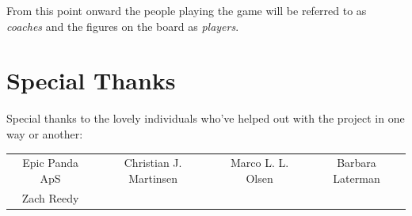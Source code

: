 \documentclass[a4paper]{book}
\begin{document}
\begin{note}
    From this point onward the people playing the game will be referred to as \textit{coaches} and the figures on the board as \textit{players}.
\end{note}

\section*{Special Thanks}
Special thanks to the lovely individuals who've helped out with the project in one way or another:
\begin{center}
    \begin{tabular}{cccc}
        Epic Panda ApS & Christian J. Martinsen & Marco L. L. Olsen & Barbara Laterman \\ Zach Reedy\\
    \end{tabular}
\end{center}

\tableofcontents
\mainmatter

\appendix
%

%
\end{document}
